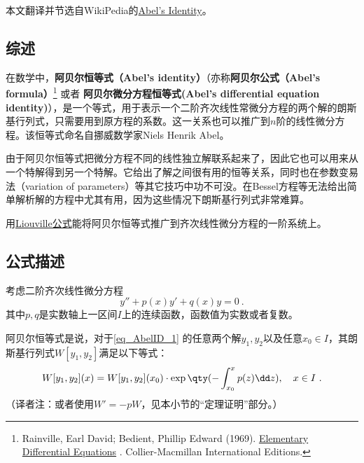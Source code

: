 
本文翻译并节选自WikiPedia的\href{https://en.wikipedia.org/wiki/Abel\%27s_identity}{Abel's Identity}。


\subsection{综述}

在数学中，\textbf{阿贝尔恒等式（Abel's identity）}（亦称\textbf{阿贝尔公式（Abel's formula）}\footnote{ Rainville, Earl David; Bedient, Phillip Edward (1969). \href{https://archive.org/details/elementarydiffer00rain}{ Elementary Differential Equations} . Collier-Macmillan International Editions.} 或者 \textbf{阿贝尔微分方程恒等式(Abel's differential equation identity)}），是一个等式，用于表示一个二阶齐次线性常微分方程的两个解的朗斯基行列式，只需要用到原方程的系数。这一关系也可以推广到$n$阶的线性微分方程。该恒等式命名自挪威数学家Niels Henrik Abel。

由于阿贝尔恒等式把微分方程不同的线性独立解联系起来了，因此它也可以用来从一个特解得到另一个特解。它给出了解之间很有用的恒等关系，同时也在参数变易法（variation of parameters）等其它技巧中功不可没。在Bessel方程等无法给出简单解析解的方程中尤其有用，因为这些情况下朗斯基行列式非常难算。

用\href{https://en.wikipedia.org/wiki/Liouville\%27s_formula}{Liouville公式}能将阿贝尔恒等式推广到齐次线性微分方程的一阶系统上。



\subsection{公式描述}

考虑二阶齐次线性微分方程
\begin{equation}\label{eq_AbelID_1}
y'' + p(x)y' +q(x)y = 0~.
\end{equation}
其中$p, q$是实数轴上一区间$I$上的连续函数，函数值为实数或者复数。

阿贝尔恒等式是说，对于\autoref{eq_AbelID_1} 的任意两个解$y_1, y_2$以及任意$x_0\in I$，其朗斯基行列式$W[y_1, y_2]$满足以下等式：
\begin{equation}\label{eq_AbelID_4}
W[y_1, y_2](x) = W[y_1, y_2](x_0)\cdot \exp\qty(-\int _{x_0}^x p(z)\dd z), \quad x\in I~.
\end{equation}
（译者注：或者使用$W'=-pW$，见本小节的“定理证明”部分。）


